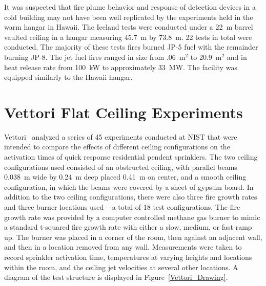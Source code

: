 It was suspected that fire plume behavior and response of detection devices in a cold building may not have been well replicated by the experiments held in the warm hangar in Hawaii. The Iceland tests were conducted under a 22~m barrel vaulted ceiling in a hangar measuring 45.7~m by 73.8~m. 22 tests in total were conducted. The majority of these tests fires burned JP-5 fuel with the remainder burning JP-8. The jet fuel fires ranged in size from .06~m$^2$ to 20.9~m$^2$ and in heat release rate from 100~kW to approximately 33~MW. The facility was equipped similarly to the Hawaii hangar.

\section{Vettori Flat Ceiling Experiments}

Vettori~\cite{Vettori:1} analyzed a series of 45 experiments conducted at NIST that were intended to compare the effects of different ceiling configurations on the activation times of quick response residential pendent sprinklers. The two ceiling configurations used consisted of an obstructed ceiling, with parallel beams 0.038~m wide by 0.24~m deep placed 0.41~m on center, and a smooth ceiling configuration, in which the beams were covered by a sheet of gypsum board.  In addition to the two ceiling configurations, there were also three fire growth rates and three burner locations used -- a total of 18 test configurations. The fire growth rate was provided by a computer controlled methane gas burner to mimic a standard t-squared fire growth rate with either a slow, medium, or fast ramp up. The burner was placed in a corner of the room, then against an adjacent wall, and then in a location removed from any wall. Measurements were taken to record sprinkler activation time, temperatures at varying heights and locations within the room, and the ceiling jet velocities at several other locations.  A diagram of the test structure is displayed in Figure~\ref{Vettori_Drawing}.

